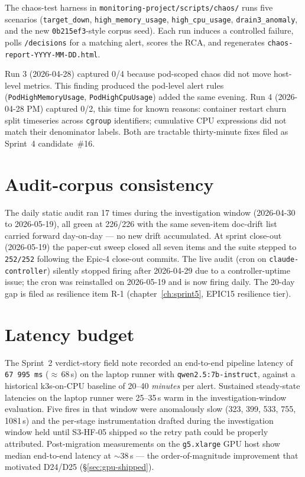 \documentclass[11pt,a4paper,oneside]{report}
\begin{document}
The chaos-test harness in
\texttt{monitoring-project/scripts/chaos/} runs five scenarios
(\texttt{target\_down}, \texttt{high\_memory\_usage},
\texttt{high\_cpu\_usage}, \texttt{drain3\_anomaly}, and the new
\texttt{0b215ef3}-style corpus seed).  Each run induces a controlled
failure, polls \texttt{/decisions} for a matching alert, scores the
RCA, and regenerates \texttt{chaos-report-YYYY-MM-DD.html}.

Run 3 (2026-04-28) captured 0/4 because pod-scoped chaos did not
move host-level metrics.  This finding produced the pod-level alert
rules (\texttt{PodHighMemoryUsage}, \texttt{PodHighCpuUsage}) added
the same evening.  Run 4 (2026-04-28 PM) captured 0/2, this time
for known reasons: container restart churn split timeseries across
\texttt{cgroup} identifiers; cumulative CPU expressions did not match
their denominator labels.  Both are tractable thirty-minute fixes
filed as Sprint~4 candidate~\#16.

\section{Audit-corpus consistency}

The daily static audit ran 17 times during the investigation window
(2026-04-30 to 2026-05-19), all green at 226/226 with the same
seven-item doc-drift list carried forward day-on-day --- no new drift
accumulated.  At sprint close-out (2026-05-19) the paper-cut sweep
closed all seven items and the suite stepped to \texttt{252/252}
following the Epic-4 close-out commits.  The live audit (cron on
\texttt{claude-controller}) silently stopped firing after 2026-04-29
due to a controller-uptime issue; the cron was reinstalled on
2026-05-19 and is now firing daily.  The 20-day gap is filed as
resilience item R-1 (chapter~\ref{ch:sprint5}, EPIC15 resilience tier).

\section{Latency budget}

The Sprint~2 verdict-story field note recorded an end-to-end pipeline
latency of \texttt{67\,995\,ms} ($\approx$\,68\,s) on the laptop
runner with \texttt{qwen2.5:7b-instruct}, against a historical
k3s-on-CPU baseline of 20--40 \emph{minutes} per alert.  Sustained
steady-state latencies on the laptop runner were 25--35\,s warm in
the investigation-window evaluation.  Five fires in that window
were anomalously slow (323, 399, 533, 755, 1081\,s) and the
per-stage instrumentation drafted during the investigation window
held until S3-HF-05 shipped so the retry path could be properly
attributed.  Post-migration measurements on the
\texttt{g5.xlarge} GPU host show median end-to-end latency at
$\sim$38\,s --- the order-of-magnitude improvement that motivated
D24/D25 (\S\ref{sec:gpu-shipped}).
\end{document}
